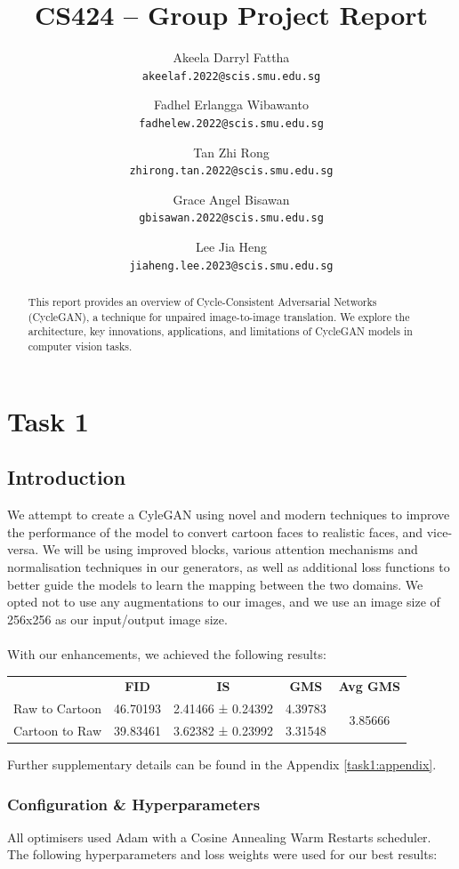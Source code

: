 \documentclass[twoside,english,notitlepage]{report}
\title{CS424 – Group Project Report}
\author{
    Akeela Darryl Fattha\\
    \texttt{akeelaf.2022@scis.smu.edu.sg}
    \and
    Fadhel Erlangga Wibawanto\\
    \texttt{fadhelew.2022@scis.smu.edu.sg}
    \and
    Tan Zhi Rong\\
    \texttt{zhirong.tan.2022@scis.smu.edu.sg}
    \and
    Grace Angel Bisawan \\
    \texttt{gbisawan.2022@scis.smu.edu.sg}
    \and
    Lee Jia Heng\\
    \texttt{jiaheng.lee.2023@scis.smu.edu.sg}
}
\begin{document}
\date{}
\maketitle
\begin{abstract}
This report provides an overview of Cycle-Consistent Adversarial Networks (CycleGAN), a technique for unpaired image-to-image translation. We explore the architecture, key innovations, applications, and limitations of CycleGAN models in computer vision tasks.
\end{abstract}
\tableofcontents


\chapter{Task 1}

\section{Introduction}
We attempt to create a CyleGAN using novel and modern techniques to improve the performance of the model to convert cartoon faces to realistic faces, and vice-versa. We will be using improved blocks, various attention mechanisms and normalisation techniques in our generators, as well as additional loss functions to better guide the models to learn the mapping between the two domains. We opted not to use any augmentations to our images, and we use an image size of 256x256 as our input/output image size. \\\\
With our enhancements, we achieved the following results:

\begin{table}[h]
    \centering
    \begin{tabular}{|l|c|c|c|c|}
    \hline
    \textbf{} & \textbf{FID} & \textbf{IS} & \textbf{GMS} & \textbf{Avg GMS} \\
    \cline{1-5}
    Raw to Cartoon     & 46.70193     & 2.41466 ± 0.24392   & 4.39783    & \multirow{2}{*}{3.85666} \\
    Cartoon to Raw     & 39.83461         & 3.62382 ± 0.23992        & 3.31548        &            \\
    \hline
    \end{tabular}
\end{table}

\noindent Further supplementary details can be found in the Appendix \ref{task1:appendix}.

\subsection{Configuration \& Hyperparameters}
All optimisers used Adam with a Cosine Annealing Warm Restarts scheduler. The following hyperparameters and loss weights were used for our best results:
\end{document}

